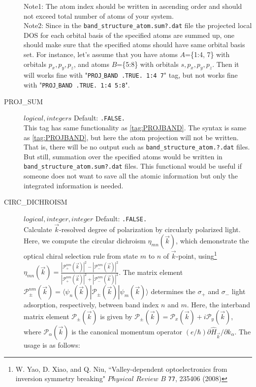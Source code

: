 \documentclass[a4paper,12pt]{scrartcl}
\makeatletter
\def\namedlabel#1#2{\begingroup
    #2%
    \def\@currentlabel{#2}%
    \phantomsection\label{#1}\endgroup
}
\makeatother
\begin{document}
\begin{description}
    Note1: The atom index should be written in ascending order
    and should not exceed total number of atoms of your system. \\
    Note2: Since in the \texttt{band\_structure\_atom.sum?.dat} file 
    the projected local DOS for each orbital basis of the specified atoms are 
    summed up, one should make sure that the specified atoms should have same orbital basis set. For instance, let's assume that you have atoms $A$=\{1:4, 7\} with orbitals $p_x, p_y, p_z$, and atoms $B$=\{5:8\} with orbitals $s, p_x, p_y, p_z$. Then it will works fine with "\texttt{PROJ$\_$BAND .TRUE. 1:4 7}" tag, but not works fine with 
        "\texttt{PROJ$\_$BAND .TRUE. 1:4 5:8}".
     
    \item[\namedlabel{tag:PROSUM}{PROJ\_SUM}] $logical, integers$ Default: \texttt{.FALSE.} \\
		This tag has same functionality as \ref{tag:PROJBAND}. The syntax is same as  \ref{tag:PROJBAND}, but here the atom projection will not be written. That is, there will be no output such as \texttt{band\_structure\_atom.?.dat} files. But still, summation over the specified atoms would be written  in \texttt{band\_structure\_atom.sum?.dat} files. This functional would be useful if someone does not want to save all the atomic information but only the integrated information is needed.
      
     \item[\namedlabel{tag:CIRC}{CIRC\_DICHROISM}] $logical, integer, integer$ Default: \texttt{.FALSE.} \\  
		Calculate ${\vec k}$-resolved degree of polarization by circularly polarized light. Here, we compute the circular dichroism $\eta_{mn}({\vec k})$, which demonstrate the optical chiral selection rule from state $m$ to $n$ of ${\vec k}$-point, using\footnote{W. Yao, D. Xiao, and Q. Niu, ``Valley-dependent optoelectronics from inversion symmetry breaking" $Physical$ $Review$ $B$  \texttt{77}, 235406 (2008)}
				$\eta_{mn}({\vec k}) = \frac{|\mathcal{P}^{nm}_+({\vec k})|^2 - |\mathcal{P}^{nm}_-({\vec k})|^2}{|\mathcal{P}^{nm}_+({\vec k})|^2 + |\mathcal{P}^{nm}_-({\vec k})|^2}$. 
				The matrix element $\mathcal{P}^{nm}_{\pm}({\vec k}) = \langle \psi_n({\vec k})|  \mathcal{P}_{\pm}({\vec k}) |\psi_m({\vec k}) \rangle$ determines the $\sigma_+$ and $\sigma_-$ light adsorption, respectively, between band index $n$ and $m$. 
				Here, the interband matrix element $\mathcal{P}_{\pm}({\vec k})$ is given by 
				$\mathcal{P}_{\pm}({\vec k}) = \mathcal{P}_x({\vec k}) + i \mathcal{P}_y({\vec k})$, where $\mathcal{P}_\alpha({\vec k})$ is the canonical momentum operator $(e/\hbar) \partial \hat{H}_{\vec k} / \partial k_\alpha$.
				The usage is as follows:
	

\end{description}
\end{document}
